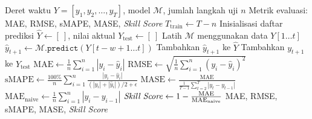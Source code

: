 \begin{algorithm}[htbp]
\caption{\textit{Walk-Forward Validation} untuk Evaluasi Model Peramalan}
\label{alg:walk-forward}
\begin{algorithmic}[1]
\Require Deret waktu $Y = [y_1, y_2, \ldots, y_T]$, model $\mathcal{M}$, jumlah langkah uji $n$
\Ensure Metrik evaluasi: MAE, RMSE, sMAPE, MASE, \textit{Skill Score}
\State $T_{\text{train}} \gets T - n$
\State Inisialisasi daftar prediksi $\hat{Y} \gets [\ ]$, nilai aktual $Y_{\text{test}} \gets [\ ]$
    \State Latih $\mathcal{M}$ menggunakan data $Y[1 \ldots t]$
    \State $\hat{y}_{t+1} \gets \mathcal{M}.\texttt{predict}(Y[t - w + 1 \ldots t])$
    \State Tambahkan $\hat{y}_{t+1}$ ke $\hat{Y}$
    \State Tambahkan $y_{t+1}$ ke $Y_{\text{test}}$
\EndFor
\State $\text{MAE} \gets \frac{1}{n} \sum_{i=1}^{n} |y_i - \hat{y}_i|$
\State $\text{RMSE} \gets \sqrt{\frac{1}{n} \sum_{i=1}^{n} (y_i - \hat{y}_i)^2}$
\State $\text{sMAPE} \gets \frac{100\%}{n} \sum_{i=1}^{n} \frac{|y_i - \hat{y}_i|}{(|y_i| + |\hat{y}_i|)/2 + \epsilon}$
\State $\text{MASE} \gets \frac{\text{MAE}}{\frac{1}{T-1}\sum_{t=2}^{T}|y_t - y_{t-1}|}$
\State $\text{MAE}_{\text{naive}} \gets \frac{1}{n} \sum_{i=1}^{n} |y_i - y_{i-1}|$
\State $\text{\textit{Skill Score}} \gets 1 - \frac{\text{MAE}}{\text{MAE}_{\text{naive}}}$
\State \Return MAE, RMSE, sMAPE, MASE, \textit{Skill Score}
\end{algorithmic}
\end{algorithm}
